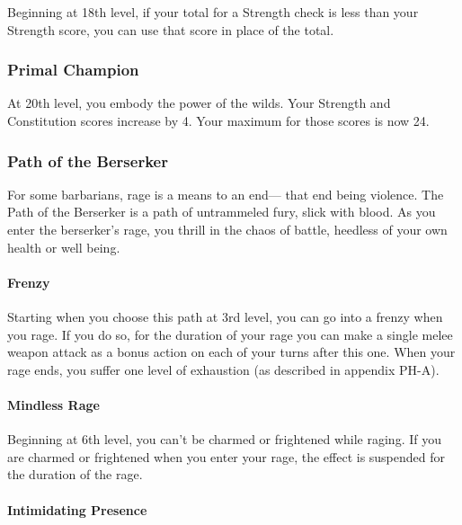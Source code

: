 Beginning at 18th level, if your total for a Strength check is less than
your Strength score, you can use that score in place of the total.

\hypertarget{primal-champion}{%
\subsubsection{Primal Champion}\label{primal-champion}}

At 20th level, you embody the power of the wilds. Your Strength and
Constitution scores increase by 4. Your maximum for those scores is now
24.

\hypertarget{path-of-the-berserker}{%
\subsubsection{Path of the Berserker}\label{path-of-the-berserker}}

For some barbarians, rage is a means to an end--- that end being
violence. The Path of the Berserker is a path of untrammeled fury, slick
with blood. As you enter the berserker's rage, you thrill in the chaos
of battle, heedless of your own health or well being.

\hypertarget{frenzy}{%
\paragraph{Frenzy}\label{frenzy}}

Starting when you choose this path at 3rd level, you can go into a
frenzy when you rage. If you do so, for the duration of your rage you
can make a single melee weapon attack as a bonus action on each of your
turns after this one. When your rage ends, you suffer one level of
exhaustion (as described in appendix PH-A).

\hypertarget{mindless-rage}{%
\paragraph{Mindless Rage}\label{mindless-rage}}

Beginning at 6th level, you can't be charmed or frightened while raging.
If you are charmed or frightened when you enter your rage, the effect is
suspended for the duration of the rage.

\hypertarget{intimidating-presence}{%
\paragraph{Intimidating Presence}\label{intimidating-presence}}

